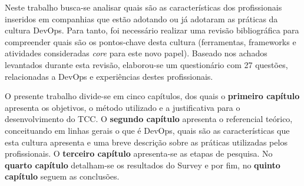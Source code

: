 \documentclass[twoside,english,brazilian]{UNISINOSartigo}
\begin{document}




Neste trabalho busca-se analisar quais são as características dos profissionais inseridos em companhias que estão adotando ou já adotaram as práticas da cultura DevOps. Para tanto, foi necessário realizar uma revisão bibliográfica para compreender quais são os pontos-chave desta cultura (ferramentas, frameworks e atividades consideradas \textit{core} para este novo papel). Baseado nos achados levantados durante esta revisão, elaborou-se um questionário com 27 questões, relacionadas a DevOps e experiências destes profissionais. 

O presente trabalho divide-se em cinco capítulos, dos quais o \textbf{primeiro capítulo} apresenta os objetivos, o método utilizado e a justificativa para o desenvolvimento do TCC. O \textbf{segundo capítulo} apresenta o referencial teórico, conceituando em linhas gerais o que é DevOps, quais são as características que esta cultura apresenta e uma breve descrição sobre as práticas utilizadas pelos profissionais. O \textbf{terceiro capítulo} apresenta-se as etapas de pesquisa. No \textbf{quarto capítulo} detalham-se os resultados do Survey e por fim, no \textbf{quinto capítulo} seguem as conclusões.
\end{document}
